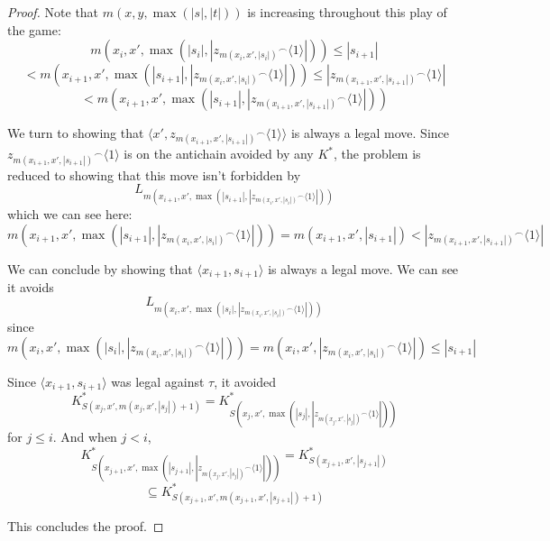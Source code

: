 \documentclass[11pt]{article}
\theoremstyle{plain}
\theoremstyle{definition}
\theoremstyle{remark}
\newcommand{\<}{\langle}
\renewcommand{\>}{\rangle}
\begin{document}
\begin{proof}
Note that $m(x,y,\max(|s|,|t|))$ is increasing throughout this play of the game:
  \[
    m(x_i,x',\max(|s_i|,|{z_{m(x_i,x',|s_i|)}}^\frown\<1\>|))
    \leq
    |s_{i+1}| 
  \]
  \[
    <
    m(x_{i+1},x',\max(|s_{i+1}|,|{z_{m(x_i,x',|s_i|)}}^\frown\<1\>|))
    \leq
    |{z_{m(x_{i+1},x',|s_{i+1}|)}}^\frown\<1\>|
  \]
  \[
    <
    m(x_{i+1},x',\max(|s_{i+1}|,|{z_{m(x_{i+1},x',|s_{i+1}|)}}^\frown\<1\>|))
  \]

We turn to showing that $\<x', {z_{m(x_{i+1},x',|s_{i+1}|)}}^\frown\<1\>\>$ is always a legal move. Since ${z_{m(x_{i+1},x',|s_{i+1}|)}}^\frown\<1\>$ is on the antichain avoided by any $K^*$, the problem is reduced to showing that this move isn't forbidden by
  \[
  L_{m(x_{i+1},x',\max(|s_{i+1}|,|{z_{m(x_i,x',|s_i|)}}^\frown\<1\>|))}
  \]
which we can see here:
  \[
    m(x_{i+1},x',\max(|s_{i+1}|,|{z_{m(x_i,x',|s_i|)}}^\frown\<1\>|)) =
    m(x_{i+1},x',|s_{i+1}|) <
    |{z_{m(x_{i+1},x',|s_{i+1}|)}}^\frown\<1\>|
  \]

We can conclude by showing that $\<x_{i+1},s_{i+1}\>$ is always a legal move. We can see it avoids 
  \[
  L_{m(x_{i},x',\max(|s_{i}|,|{z_{m(x_i,x',|s_i|)}}^\frown\<1\>|))}
  \]
since
  \[
    m(x_{i},x',\max(|s_{i}|,|{z_{m(x_i,x',|s_i|)}}^\frown\<1\>|)) =
    m(x_{i},x',|{z_{m(x_i,x',|s_i|)}}^\frown\<1\>|) \leq
    |s_{i+1}|
  \]

Since $\<x_{i+1},s_{i+1}\>$ was legal against $\tau$, it avoided
  \[
    K^*_{S(x_j,x',m(x_j,x',|s_j|)+1)} = 
    K^*_{S(x_j,x',\max(|s_j|,|{z_{m(x_j,x',|s_j|)}}^\frown\<1\>|))}
  \]
for $j\leq i$. And when $j<i$,
  \[
    K^*_{S(x_{j+1},x',\max(|s_{j+1}|,|{z_{m(x_j,x',|s_j|)}}^\frown\<1\>|))} =
    K^*_{S(x_{j+1},x',|s_{j+1}|)}
  \]
  \[
    \subseteq
    K^*_{S(x_{j+1},x',m(x_{j+1},x',|s_{j+1}|)+1)}
  \]

This concludes the proof.
\end{proof}
\end{document}
